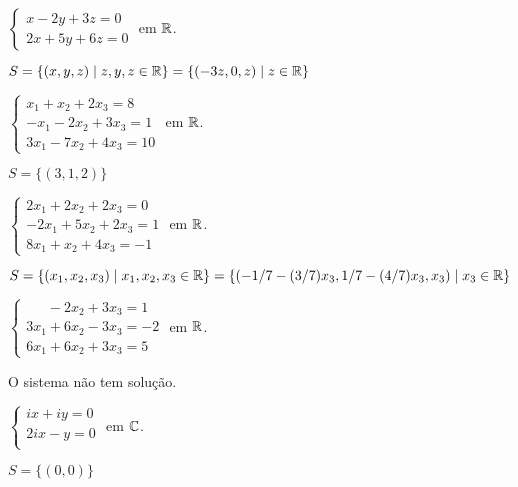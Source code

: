 \documentclass[12pt]{exam}
\begin{document}
\begin{exercicio}
  $
    \begin{cases}
      x - 2y + 3z = 0\\
      2x + 5y + 6z = 0
    \end{cases}
  $
  em $\mathbb{R}$.
  \begin{solucao}
    $S = \{(x, y, z) \mid z, y, z \in \mathbb{R}\} = \{(-3z, 0, z) \mid z \in \mathbb{R}\}$
  \end{solucao}
\end{exercicio}

\begin{exercicio}
  $
    \begin{cases}
      x_1 + x_2 + 2x_3 = 8\\
      -x_1 - 2x_2 + 3x_3 = 1\\
      3x_1 - 7x_2 + 4x_3 = 10
    \end{cases}
  $
  em $\mathbb{R}$.
  \begin{solucao}
    $S = \{(3, 1, 2)\}$
  \end{solucao}
\end{exercicio}

\begin{exercicio}
  $
    \begin{cases}
      2x_1 + 2x_2 + 2x_3 = 0\\
      -2x_1 + 5x_2 + 2x_3 = 1\\
      8x_1 + x_2 + 4x_3 = -1
    \end{cases}
  $
  em $\mathbb{R}$.
  \begin{solucao}
    $S = \{(x_1, x_2, x_3) \mid x_1, x_2, x_3 \in \mathbb{R}\} = \{(-1/7 - (3/7)x_3, 1/7 - (4/7)x_3, x_3) \mid x_3 \in \mathbb{R}\}$
  \end{solucao}
\end{exercicio}

\begin{exercicio}
  $
    \begin{cases}
      \phantom{2x_1} - 2x_2 + 3x_3 = 1\\
      3x_1 + 6x_2 - 3x_3 = -2\\
      6x_1 + 6x_2 + 3x_3 = 5
    \end{cases}
  $
  em $\mathbb{R}$.
  \begin{solucao}
    O sistema não tem solução.
  \end{solucao}
\end{exercicio}

\begin{exercicio}\label{sistema_linear_eliminacao}
  $
    \begin{cases}
      ix + iy = 0\\
      2ix - y = 0\\
    \end{cases}
  $
  em $\mathbb{C}$.
  \begin{solucao}
    $S = \{(0, 0)\}$
  \end{solucao}
\end{exercicio}
\end{document}
